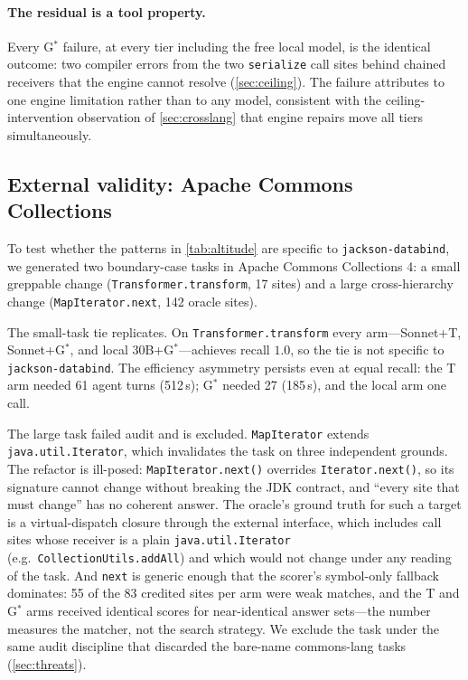 \documentclass[11pt]{article}
\newcommand{\code}[1]{\texttt{#1}}
\newcommand{\gstar}{G$^{*}$}
\begin{document}
\paragraph{The residual is a tool property.}
Every \gstar{} failure, at every tier including the free local model, is the
identical outcome: two compiler errors from the two \code{serialize} call
sites behind chained receivers that the engine cannot resolve
(\cref{sec:ceiling}). The failure attributes to one engine limitation rather
than to any model, consistent with the ceiling-intervention observation of
\cref{sec:crosslang} that engine repairs move all tiers simultaneously.

\subsection{External validity: Apache Commons Collections}
\label{sec:external}

To test whether the patterns in \cref{tab:altitude} are specific to
\code{jackson-databind}, we generated two boundary-case tasks in Apache
Commons Collections 4: a small greppable change
(\code{Transformer.transform}, 17 sites) and a large cross-hierarchy change
(\code{MapIterator.next}, 142 oracle sites).

The small-task tie replicates. On \code{Transformer.transform}
every arm---Sonnet+T, Sonnet+\gstar{}, and local 30B+\gstar{}---achieves
recall $1.0$, so the tie is not specific to
\code{jackson-databind}. The efficiency asymmetry persists even at equal
recall: the T arm needed 61 agent turns (512\,s); \gstar{} needed 27
(185\,s), and the local arm one call.

The large task failed audit and is excluded. \code{MapIterator}
extends \code{java.util.Iterator}, which invalidates the task on three
independent grounds. The refactor is ill-posed:
\code{MapIterator.next()} overrides \code{Iterator.next()}, so its
signature cannot change without breaking the JDK contract, and ``every site
that must change'' has no coherent answer. The oracle's ground
truth for such a target is a virtual-dispatch closure through the external
interface, which includes call sites whose receiver is a plain
\code{java.util.Iterator} (e.g.\ \code{CollectionUtils.addAll}) and which
would not change under any reading of the task. And \code{next} is
generic enough that the scorer's symbol-only fallback dominates: 55 of the
83 credited sites per arm were weak matches, and the T and \gstar{} arms
received identical scores for near-identical answer sets---the number
measures the matcher, not the search strategy. We exclude the task under
the same audit discipline that discarded the bare-name commons-lang tasks
(\cref{sec:threats}).
\end{document}
